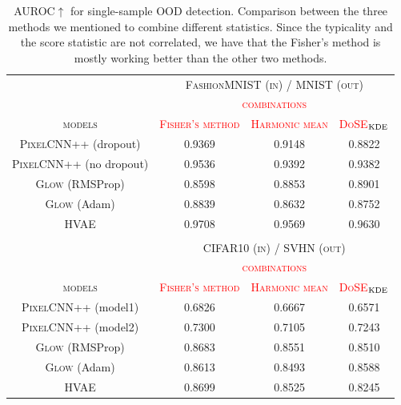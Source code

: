 {\begin{table}[tb]
    \centering
    \caption[AUROC$\uparrow$ for single-sample OOD detection comparing three methods of combining different statistics with models trained on FashionMNIST (tested on MNIST) and CIFAR10 (tested on SVHN).]{AUROC$\uparrow$ for single-sample OOD detection. Comparison between the three methods we mentioned to combine different statistics. Since the typicality and the score statistic are not correlated, we have that the Fisher's method is mostly working better than the other two methods.}
        \scriptsize
        \begin{tabular}{cccc}
            \toprule
            &\multicolumn{3}{c}{\textsc{FashionMNIST (in) / MNIST (out)}}\\
            \cmidrule{2-4}
            & \multicolumn{3}{c}{\textcolor{red}{\textsc{combinations}}}\\
            \cmidrule{2-4}
            \textsc{models}  & \textcolor{red}{\textsc{Fisher's method}} & \textcolor{red}{\textsc{Harmonic mean}} &  \textcolor{red}{\textsc{DoSE$_{\textup{KDE}}$}}  \\
            \midrule
            \textsc{PixelCNN++} (dropout) & 0.9369 & 0.9148 & 0.8822 \\
            \textsc{PixelCNN++} (no dropout)  & 0.9536 & 0.9392 & 0.9382\\
            \textsc{Glow} (RMSProp) &  0.8598 & 0.8853 &  0.8901\\
            \textsc{Glow} (Adam)  & 0.8839 & 0.8632 & 0.8752\\
            \textsc{HVAE}  & 0.9708 &  0.9569 & 0.9630\\
            \bottomrule
            & & &  \\
            \toprule
            & \multicolumn{3}{c}{\textsc{CIFAR10 (in) / SVHN (out)}}\\
            \cmidrule{2-4}
            & \multicolumn{3}{c}{\textcolor{red}{\textsc{combinations}}}\\
            \cmidrule{2-4}
            \textsc{models}  & \textcolor{red}{\textsc{Fisher's method}} & \textcolor{red}{\textsc{Harmonic mean}} &  \textcolor{red}{\textsc{DoSE$_{\textup{KDE}}$}}  \\
            \midrule
        
            \textsc{PixelCNN++} (model1)  & 0.6826 & 0.6667 & 0.6571  \\
            \textsc{PixelCNN++} (model2) & 0.7300 & 0.7105 & 0.7243 \\
            \textsc{Glow} (RMSProp)  &  0.8683 & 0.8551 & 0.8510\\
            \textsc{Glow} (Adam) & 0.8613 & 0.8493 & 0.8588  \\
            \textsc{HVAE}  & 0.8699 &  0.8525 & 0.8245 \\
            \bottomrule
        \end{tabular}
        \label{tab_modelagnostic:all_combinations}
    \vspace*{-\baselineskip}
\end{table}

}
